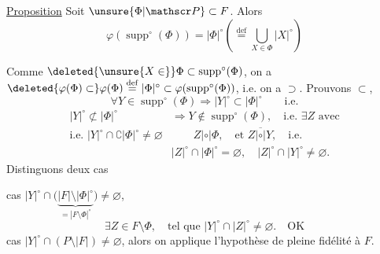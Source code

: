\uline{Proposition} Soit $\unsure{\Phi|\mathscr P}\subset F$. Alors
\[
\varphi(\operatorname{supp}^{\circ}(\Phi))=|\Phi|^{\circ}
\left(\overset{\mathrm{def}}{=}\bigcup_{X\in\Phi}|X|^{\circ}\right)
\tag*{(*)}
\]

 Comme $\deleted{\unsure{X\in}}\Phi\subset\operatorname{supp}^{\circ}(\Phi)$, on a $\deleted{\varphi(\Phi)\subset}\varphi(\Phi)\overset{\mathrm{def}}{=}|\Phi|^{\circ}\subset\varphi(\operatorname{supp}^{\circ}(\Phi))$, i.e. on a $\supset$. Prouvons $\subset$, 
\[
\forall Y\in\operatorname{supp}^{\circ}(\Phi)\Longrightarrow |Y|^{\circ}\subset|\Phi|^{\circ}\qquad\text{i.e.}
\]
\[
\begin{aligned}
|Y|^{\circ}\not\subset|\Phi|^{\circ}&\Longrightarrow Y\notin\operatorname{supp}^{\circ}(\Phi),\quad\text{i.e. }\exists Z\text{ avec}\\
\text{i.e. }|Y|^{\circ}\cap\complement|\Phi|^{\circ}\neq\varnothing
&\qquad Z\mathrel{|\circ|}\Phi,\quad\text{et }Z\mathrel{\overline{|\circ|}}Y,\quad\text{i.e.}\\
&|Z|^{\circ}\cap|\Phi|^{\circ}=\varnothing,\quad|Z|^{\circ}\cap|Y|^{\circ}\neq\varnothing.
\end{aligned}
\]
Distinguons deux cas

cas $|Y|^{\circ}\cap\bigl(\underbrace{|F|\setminus|\Phi|^{\circ}}_{=|F\setminus\Phi|^{\circ}}\bigr)\neq\varnothing$, 
\[
\exists Z\in F\setminus\Phi,\quad\text{tel que }|Y|^{\circ}\cap|Z|^{\circ}\neq\varnothing.\quad\text{OK}
\]
cas $|Y|^{\circ}\cap(P\setminus|F|)\neq\varnothing$, alors on applique l'hypothèse de pleine fidélité à $F$.
\clearpage
{}

